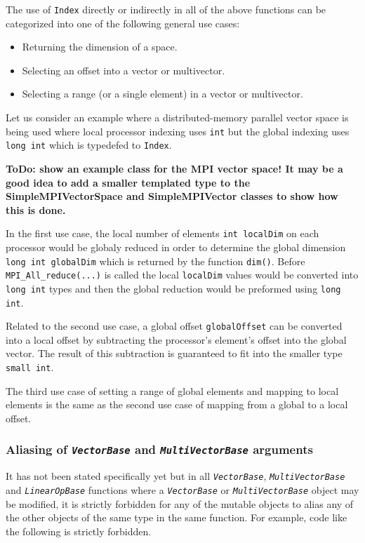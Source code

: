 \documentclass[pdf,ps2pdf,11pt]{SANDreport}
\begin{document}
The use of {}\texttt{Index} directly or indirectly in all of the above
functions can be categorized into one of the following general use cases:

\begin{itemize}
%
\item Returning the dimension of a space.
%
\item Selecting an offset into a vector or multivector.
%
\item Selecting a range (or a single element) in a vector or multivector.
%
\end{itemize}

Let us consider an example where a distributed-memory parallel vector space is
being used where local processor indexing uses {}\texttt{int} but the global
indexing uses {}\texttt{long int} which is typedefed to {}\texttt{Index}.

{}\textbf{ToDo: show an example class for the MPI vector space!  It may be a
good idea to add a smaller templated type to the SimpleMPIVectorSpace and
SimpleMPIVector classes to show how this is done. }

In the first use case, the local number of elements {}\texttt{int localDim} on
each processor would be globaly reduced in order to determine the global
dimension {}\texttt{long int globalDim} which is returned by the function
{}\texttt{dim()}.  Before {}\texttt{MPI\-\_All\-\_reduce(...)} is called the
local {}\texttt{localDim} values would be converted into {}\texttt{long int}
types and then the global reduction would be preformed using {}\texttt{long
int}.

Related to the second use case, a global offset {}\texttt{globalOffset} can be
converted into a local offset by subtracting the processor's element's offset
into the global vector.  The result of this subtraction is guaranteed to fit
into the smaller type {}\texttt{small int}.

The third use case of setting a range of global elements and mapping to local
elements is the same as the second use case of mapping from a global to a
local offset.

%
\subsubsection{Aliasing of {}\texttt{\textit{Vector\-Base}} and {}\texttt{\textit{Multi\-Vector\-Base}} arguments}
\label{tsfcore:sec:aliasing}
%

It has not been stated specifically yet but in all
{}\texttt{\textit{Vector\-Base}}, {}\texttt{\textit{Multi\-Vector\-Base}} and
{}\texttt{\textit{Linear\-Op\-Base}} functions where a
{}\texttt{\textit{Vector\-Base}} or {}\texttt{\textit{Multi\-Vector\-Base}}
object may be modified, it is strictly forbidden for any of the mutable
objects to alias any of the other objects of the same type in the same
function.  For example, code like the following is strictly forbidden.
\end{document}
